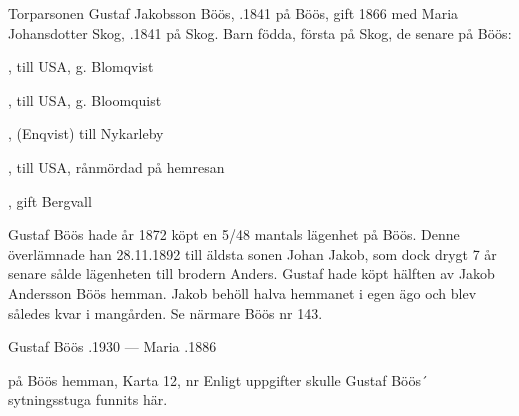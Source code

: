 %
Torparsonen Gustaf Jakobsson Böös, .1841 på Böös, gift 1866 med Maria Johansdotter Skog, .1841 på Skog. Barn födda, första på Skog, de senare på Böös:
\begin{jhchildren}
  \item {}
  \item {}, till USA, g. Blomqvist
  \item {}
  \item {}
  \item {}, till USA, g. Bloomquist
  \item {}, (Enqvist) till Nykarleby
  \item {}, till USA, rånmördad på hemresan
  \item {}, gift Bergvall
\end{jhchildren}
Gustaf Böös	 hade år 1872 köpt en 5/48 mantals lägenhet på Böös. Denne överlämnade han 28.11.1892 till äldsta sonen Johan Jakob, som dock drygt 7 år senare sålde lägenheten till brodern Anders. Gustaf hade köpt hälften av Jakob Andersson Böös hemman. Jakob behöll halva hemmanet i egen ägo och blev således kvar i mangården. Se närmare Böös nr 143.

Gustaf Böös .1930  ---  Maria .1886


 på Böös hemman, Karta 12, nr 
Enligt uppgifter skulle Gustaf Böös´ sytningsstuga funnits här.



%



